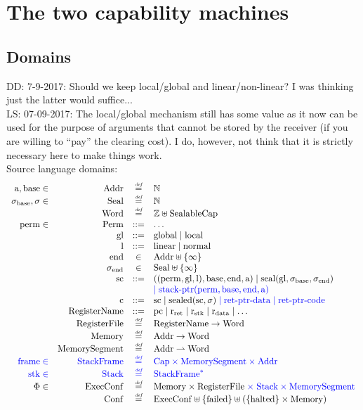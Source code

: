 \documentclass[a4paper]{article}
\newcommand\lau[1]{{\color{purple} \sf \footnotesize {LS: #1}}\\}
\newcommand\dominique[1]{{\color{purple} \sf \footnotesize {DD: #1}}\\}
\newcommand{\defeq}{\stackrel{\textit{\tiny{def}}}{=}}
\newcommand{\defbnf}{::=}
\newcommand{\fun}{\rightarrow}
\newcommand{\parfun}{\rightharpoonup}
\newcommand{\sourcecolor}[1]{\color{blue}}
\newcommand{\src}[1]{{\sourcecolor{} #1}}
\newcommand{\nats}{\mathbb{N}}
\newcommand{\ints}{\mathbb{Z}}
\newcommand{\shareddom}[1]{\mathrm{#1}}
\newcommand{\RegName}{\shareddom{RegisterName}}
\newcommand{\Addr}{\shareddom{Addr}}
\newcommand{\Seal}{\shareddom{Seal}}
\newcommand{\Perm}{\shareddom{Perm}}
\newcommand{\Caps}{\shareddom{Cap}}
\newcommand{\SealableCaps}{\shareddom{SealableCap}}
\newcommand{\Word}{\shareddom{Word}}
\newcommand{\Mem}{\shareddom{Memory}}
\newcommand{\Reg}{\shareddom{RegisterFile}}
\newcommand{\Conf}{\shareddom{Conf}}
\newcommand{\ExecConf}{\shareddom{ExecConf}}
\newcommand{\MemSeg}{\shareddom{MemorySegment}}
\newcommand{\StkFrame}{\shareddom{StackFrame}}
\newcommand{\Stack}{\shareddom{Stack}}
\newcommand{\scbnf}{\shareddom{sc}}
\newcommand{\cbnf}{\shareddom{c}}
\newcommand{\permbnf}{\shareddom{perm}}
\newcommand{\addrbnf}{\shareddom{a}}
\newcommand{\basebnf}{\shareddom{base}}
\newcommand{\aendbnf}{\shareddom{end}}
\newcommand{\glbnf}{\shareddom{gl}}
\newcommand{\linbnf}{\shareddom{l}}
\newcommand{\sealbasebnf}{\sigma_\shareddom{base}}
\newcommand{\sealendbnf}{\sigma_\shareddom{end}}
\newcommand{\sstk}{\shareddom{stk}}
\newcommand{\sstkframe}{\shareddom{frame}}
\newcommand{\stkptr}[1]{\mathrm{stack\text{-}ptr}(#1)}
\newcommand{\retptrd}{\mathrm{ret\text{-}ptr\text{-}data}}
\newcommand{\retptrc}{\mathrm{ret\text{-}ptr\text{-}code}}
\newcommand{\seal}[1]{\shareddom{seal}(#1)}
\newcommand{\sealed}[1]{\shareddom{sealed}(#1)}
\newcommand{\failed}{\mathrm{failed}}
\newcommand{\halted}{\mathrm{halted}}
\newcommand{\pcreg}{\mathrm{pc}}
\newcommand{\rstk}{\mathrm{r}_\mathrm{stk}}
\newcommand{\rO}{\mathrm{r}_\mathrm{ret}}
\newcommand{\rret}{\rO}
\newcommand{\rdata}{\mathrm{r}_\mathrm{data}}
\newcommand{\plainlocality}[1]{\mathrm{#1}}
\newcommand{\glob}{\plainlocality{global}}
\newcommand{\local}{\plainlocality{local}}
\newcommand{\plainlinearity}[1]{\mathrm{#1}}
\newcommand{\linear}{\plainlinearity{linear}}
\newcommand{\normal}{\plainlinearity{normal}}
\begin{document}
\section{The two capability machines}
\subsection{Domains}

\dominique{7-9-2017: Should we keep local/global and linear/non-linear?  I was thinking just the latter would suffice...}
\lau{07-09-2017: The local/global mechanism still has some value as it now can be used for the purpose of arguments that cannot be stored by the receiver (if you are willing to ``pay'' the clearing cost). I do, however, not think that it is strictly necessary here to make things work.}
Source language domains:
\[
  \begin{array}{rrcl}
   \addrbnf,\basebnf \in & \Addr & \defeq & \nats \\
    \sealbasebnf, \sigma \in & \Seal & \defeq & \nats \\
    &\Word & \defeq & \ints \uplus \SealableCaps\\
    \permbnf \in& \Perm & \defbnf & \dots \\
    &\glbnf & \defbnf & \glob \mid \local \\
    &\linbnf & \defbnf & \linear \mid \normal \\
    &\aendbnf & \in & \Addr \uplus \{\infty \} \\
    &\sealendbnf & \in & \Seal \uplus \{\infty \} \\
    &\scbnf &\defbnf & ((\permbnf,\glbnf,\linbnf),\basebnf,\aendbnf,\addrbnf) \mid \seal{\glbnf,\sealbasebnf,\sealendbnf}\\
    & & & {\sourcecolor{} \mid \stkptr{\permbnf,\basebnf,\aendbnf,\addrbnf}}\\ 
    &\cbnf & \defbnf &  \scbnf \mid \sealed{\scbnf,\sigma}{\sourcecolor{} \; \mid \retptrd \mid \retptrc}\\ 
    &\RegName & \defbnf &\pcreg \mid \rret \mid \rstk \mid \rdata \mid \dots \\
    &\Reg & \defeq & \RegName \fun \Word\\
    &\Mem & \defeq & \Addr \fun \Word \\
    &\MemSeg & \defeq & \Addr \parfun \Word \\
    {\sourcecolor{} \sstkframe \in} & {\sourcecolor{} \StkFrame} & {\sourcecolor{} \defeq} & {\sourcecolor{} \Caps \times \MemSeg \times \Addr}\\
    \src{\sstk \in}& \src{ \Stack} & \src{ \defeq} & \src{ \StkFrame^*} \\
    \Phi \in & \ExecConf & \defeq & \Mem \times \Reg {\sourcecolor{} \; \times \; \Stack \times \MemSeg }\\
    &\Conf & \defeq & \ExecConf \uplus \{\failed\} \uplus (\{\halted\} \times \Mem)
  \end{array}
\]
\end{document}
